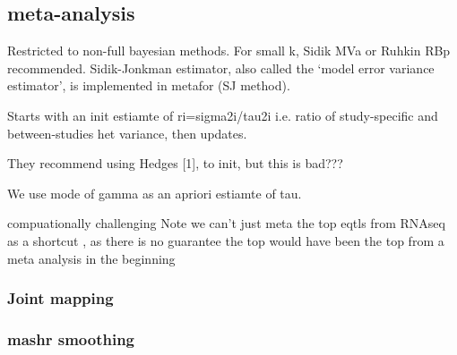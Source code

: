 \subsection{ meta-analysis}


Restricted to non-full bayesian methods.
For small k, Sidik MVa or Ruhkin RBp recommended.
Sidik-Jonkman estimator, also called the ‘model error variance estimator’, is implemented in metafor (SJ method).

Starts with an init estiamte of ri=sigma2i/tau2i i.e. ratio of study-specific and between-studies het variance, then updates.

They recommend using Hedges [1], to init, but this is bad???

We use mode of gamma as an apriori estiamte of tau.

compuationally challenging
Note we can't just meta the top eqtls from RNAseq as a shortcut , as there is no guarantee the top would have been the top from a meta analysis in the beginning

\subsubsection{Joint mapping}


\subsubsection{mashr smoothing}

